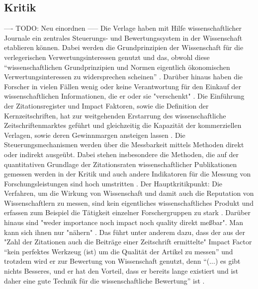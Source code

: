 \subsection{Kritik}
---- TODO: Neu einordnen -----
Die Verlage haben mit Hilfe wissenschaftlicher Journale ein zentrales Steuerungs- und Bewertungssystem in der Wissenschaft etablieren können. Dabei werden die Grundprinzipien der Wissenschaft für die verlegerischen Verwertungsinteressen genutzt und das, obwohl diese “wissenschaftlichen Grundprinzipien und Normen eigentlich ökonomischen Verwertungsinteressen zu widersprechen scheinen” \cite{hanekop_2006}. Darüber hinaus haben die Forscher in vielen Fällen wenig oder keine Verantwortung für den Einkauf der wissenschaftlichen Informationen, die er oder sie "verschenkt" \cite{steele_2006}. Die Einführung der Zitationsregister und Impact Faktoren, sowie die Definition der Kernzeitschriften, hat zur weitgehenden Erstarrung des wissenschaftliche Zeitschriftenmarktes geführt und gleichzeitig die Kapazität der kommerziellen Verlagen, sowie deren Gewinnmargen ansteigen lassen \cite{CREATe_2014}. Die Steuerungsmechanismen werden über die Messbarkeit mittels Methoden direkt oder indirekt ausgeübt. Dabei stehen insbesondere die Methoden, die auf der quantitativen Grundlage der Zitationsraten wissenschaftlicher Publikationen gemessen werden in der Kritik \cite{Dong_2005} und auch andere Indikatoren für die Messung von Forschungsleistungen sind hoch umstritten \cite{Hornbostel_1997} \cite{Hicks_1996} \cite{Havemann_2002}. Der Hauptkritikpunkt: Die Verfahren, um die Wirkung von Wissenschaft und damit auch die Reputation von Wissenschaftlern zu messen, sind kein eigentliches wissenschaftliches Produkt\cite{suchen} und erfassen zum Beispiel die Tätigkeit einzelner Forschergruppen zu stark \cite{schmoch_2009}. Darüber hinaus sind "weder importance noch impact noch quality direkt meßbar". Man kann sich ihnen nur "nähern" \cite{Hornbostel_1997}. Das führt unter anderem dazu, dass der aus der "Zahl der Zitationen auch die Beiträge einer Zeitschrift ermittelte" \cite{weishaupt_2009_goldenOA} Impact Factor “kein perfektes Werkzeug (ist) um die Qualität der Artikel zu messen” und trotzdem wird er zur Bewertung von Wissenschaft genutzt, denn “(...) es gibt nichts Besseres, und er hat den Vorteil, dass er bereits lange existiert und ist daher eine gute Technik für die wissenschaftliche Bewertung” ist \cite{garfield_1999} \cite{weishaupt_2009_goldenOA}. 

